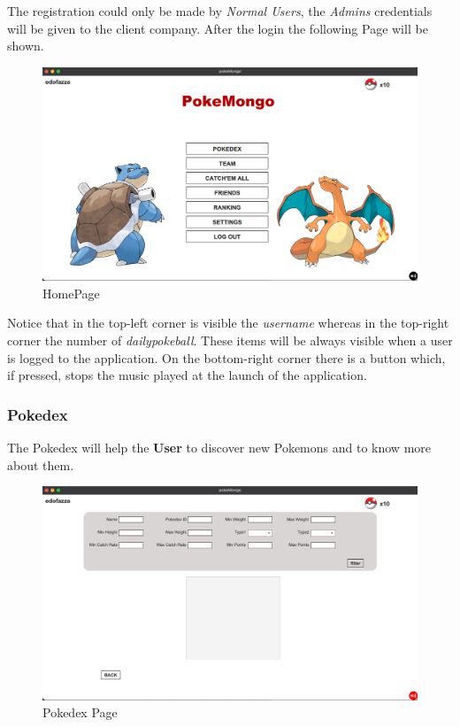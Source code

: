 The registration could only be made by \textit{Normal Users}, the \textit{Admins} credentials will be given to the client company.
After the login the following Page will be shown.
\begin{figure}[H]
	\centering
	\includegraphics[width=\textwidth]{img/userManual/main.png}
	\caption{HomePage}
\end{figure}
Notice that in the top-left corner is visible the \textit{username} whereas in the top-right corner the number of \textit{dailypokeball}. These items will be always visible when a user is logged to the application. On the bottom-right corner there is a button which, if pressed, stops the music played at the launch of the application.
\subsubsection{Pokedex}
The Pokedex will help the \textbf{User} to discover new Pokemons and to know more about them.
\begin{figure}[H]
	\centering
	\includegraphics[width=\textwidth]{img/userManual/pokedex.png}
	\caption{Pokedex Page}
\end{figure}

